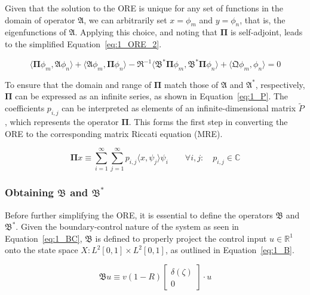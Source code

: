 Given that the solution to the ORE is unique for any set of functions in the domain of operator $\mathfrak{A}$, we can arbitrarily set ${x} = {\phi_m}$ and ${y} = {\phi_n}$, that is, the eigenfunctions of $\mathfrak{A}$. Applying this choice, and noting that $\mathbf{\Pi}$ is self-adjoint, leads to the simplified Equation~\ref{eq:1_ORE_2}.

\begin{equation} \label{eq:1_ORE_2}
    \langle \mathbf{\Pi} {\phi_m}, \mathfrak{A} {\phi_n} \rangle
    + \langle \mathfrak{A} {\phi_m}, \mathbf{\Pi} {\phi_n} \rangle
    - \mathfrak{R}^{-1} \langle \mathfrak{B}^* \mathbf{\Pi} {\phi_m}, \mathfrak{B}^* \mathbf{\Pi} {\phi_n} \rangle 
    + \langle \mathfrak{Q} {\phi_m}, {\phi_n} \rangle = 0
\end{equation}

To ensure that the domain and range of $\mathbf{\Pi}$ match those of $\mathfrak{A}$ and $\mathfrak{A}^*$, respectively, $\mathbf{\Pi}$ can be expressed as an infinite series, as shown in Equation~\ref{eq:1_P}. The coefficients $p_{i,j}$ can be interpreted as elements of an infinite-dimensional matrix $\tilde{P}$, which represents the operator $\mathbf{\Pi}$. This forms the first step in converting the ORE to the corresponding matrix Riccati equation (MRE).

\begin{equation} \label{eq:1_P}
    \mathbf{\Pi} {x} \equiv \sum_{i=1}^{\infty}\sum_{j=1}^{\infty} p_{i,j} \langle {x}, {\psi_j} \rangle {\psi_i} \qquad
    \forall {i,j}: \quad p_{i,j} \in \mathbb{C}
\end{equation}

\subsubsection{Obtaining $\mathfrak{B}$ and $\mathfrak{B}^*$}

Before further simplifying the ORE, it is essential to define the operators $\mathfrak{B}$ and $\mathfrak{B}^*$. Given the boundary-control nature of the system as seen in Equation~\ref{eq:1_BC}, $\mathfrak{B}$ is defined to properly project the control input $u \in \mathbb{R}^1$ onto the state space $X: L^2[0,1] \times L^2[0,1]$, as outlined in Equation~\ref{eq:1_B}.

\begin{equation} \label{eq:1_B}
    \mathfrak{B} u \equiv v(1-R)
    \begin{bmatrix}
        \delta(\zeta) \\ 0
    \end{bmatrix} \cdot u
\end{equation}

